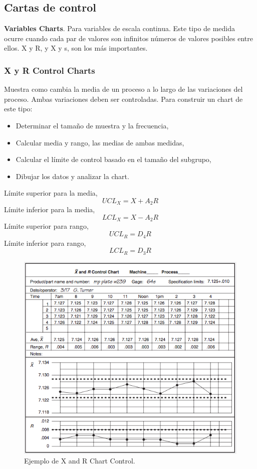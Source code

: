 \documentclass[]{article}
\begin{document}
\subsection{Cartas de control}

\textbf{Variables Charts}. Para variables de escala continua. Este tipo de medida ocurre cuando cada par de valores son infinitos números de valores posibles entre ellos. X y R, y X y s, son los más importantes.

\subsubsection{X y R Control Charts}

Muestra como cambia la media de un proceso a lo largo de las variaciones del proceso. Ambas variaciones deben ser controladas. Para construir un chart de este tipo:
\begin{itemize}
	\item Determinar el tamaño de muestra y la frecuencia,
	\item Calcular media y rango, las medias de ambas medidas,
	\item Calcular el límite de control basado en el tamaño del subgrupo,
	\item Dibujar los datos y analizar la chart.
\end{itemize}
Límite superior para la media,
\begin{equation}
UCL_X = X + A_2R
\end{equation}
Límite inferior para la media,
\begin{equation}
LCL_X = X - A_2R
\end{equation}
Límite superior para rango,
\begin{equation}
UCL_R = D_4R
\end{equation}
Límite inferior para rango,
\begin{equation}
LCL_R = D_3R
\end{equation}

\begin{figure}[H]
	\centering
	\includegraphics[width=120mm]{imagenes/XandRControlEjemplo.png}
	\caption{Ejemplo de X and R Chart Control.}
	\label{fig:XandRControlEjemplo}
\end{figure}
\end{document}
